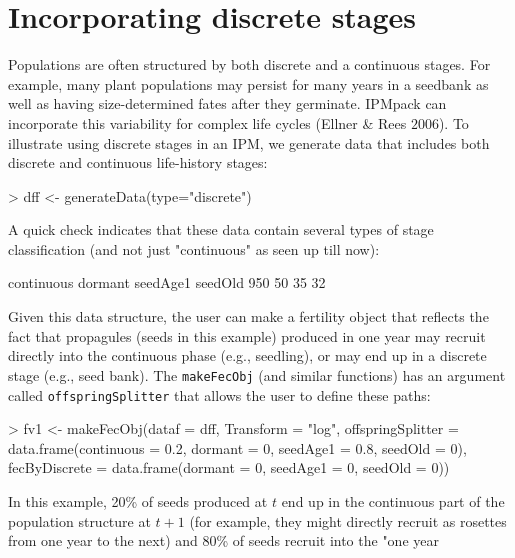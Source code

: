 \documentclass{article}
\begin{document}
\section{Incorporating discrete stages}
Populations are often structured by both discrete and a continuous stages.  For
example, many plant populations may persist for many years in a seedbank as well
as having size-determined fates after they germinate. IPMpack can incorporate
this variability for complex life cycles (Ellner \& Rees $2006$). To illustrate
using discrete stages in an IPM, we generate data that includes
both discrete and continuous life-history stages:
\begin{Schunk}
\begin{Sinput}
> dff <- generateData(type="discrete")
\end{Sinput}
\end{Schunk}
A quick check indicates that these data contain several types of stage classification (and not just "continuous" as seen up till now):
\begin{Schunk}
\begin{Soutput}
continuous    dormant   seedAge1    seedOld 
       950         50         35         32 
\end{Soutput}
\end{Schunk}
Given this data structure, the user can make a fertility object that reflects the
fact that propagules (seeds in this example) produced in one year may 
recruit directly into the continuous phase (e.g., seedling), or may end up in a
discrete stage (e.g., seed bank). The {\tt makeFecObj} (and similar functions)
has an argument called {\tt offspringSplitter} that allows the user to define
these paths:
\begin{Schunk}
\begin{Sinput}
> fv1 <- makeFecObj(dataf = dff, Transform = "log", 
                    offspringSplitter = data.frame(continuous = 0.2, 
                    dormant = 0, seedAge1 = 0.8, seedOld = 0), 
                    fecByDiscrete = data.frame(dormant = 0, 
                    seedAge1 = 0, seedOld = 0))
\end{Sinput}
\end{Schunk}
In this example, 20\% of seeds produced at $t$ end up in the continuous part of
the population structure at $t+1$ (for example, they might directly recruit as
rosettes from one year to the next) and 80\% of seeds recruit into the "one year
\end{document}
